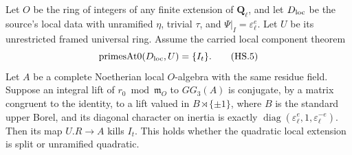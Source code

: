 \begin{lemma}
Let $O$ be the ring of integers of any finite extension of
$\mathbf Q_\ell$,
and let $D_{\rm loc}$ be the source's local data with unramified
$\eta$, trivial $\tau$, and $\Psi|_I=\varepsilon_\ell^e$.
Let $U$ be its unrestricted framed universal ring.  Assume the
carried local component theorem
\[
 \mathrm{primesAt0}(D_{\rm loc},U)=\{I_t\}.                  \tag{HS.5}
\]
Let $A$ be a complete Noetherian local $O$-algebra with the same
residue field.  Suppose an integral lift of $r_0\bmod\mathfrak m_O$
to $GG_3(A)$ is conjugate, by a matrix congruent to the identity,
to a lift valued in $B\rtimes\{\pm1\}$, where $B$ is the standard
upper Borel, and its diagonal character on inertia is exactly
$\operatorname{diag}(\varepsilon_\ell^e,1,
\varepsilon_\ell^{-e})$.  Then its map $U.R\to A$ kills $I_t$.
This holds whether the quadratic local extension is split or
unramified quadratic.
\end{lemma}

